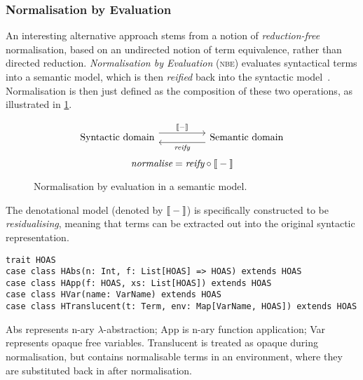 \documentclass[../../main.tex]{subfiles}
\begin{document}

\subsubsection{Normalisation by Evaluation}
An interesting alternative approach stems from a notion of \emph{reduction-free} normalisation, based on an undirected notion of term equivalence, rather than directed reduction.
\emph{Normalisation by Evaluation} (\textsc{nbe}) evaluates syntactical terms into a semantic model, which is then \emph{reified} back into the syntactic model~\cite{filinski_nbe_2004}.
Normalisation is then just defined as the composition of these two operations, as illustrated in \cref{fig:nbe}.

\begin{figure}
\begin{equation*}
\begin{tikzcd}
  \text{Syntactic domain} \arrow[rr, "\text{\textlbrackdbl} - \text{\textrbrackdbl}", shift left=2] &  & \text{Semantic domain} \arrow[ll, "\textit{reify}", shift left=2]
\end{tikzcd}
\end{equation*}
\vspace{0.5ex}
\begin{equation*}
\textit{normalise} = \textit{reify} \circ \text{\textlbrackdbl} - \text{\textrbrackdbl}
\end{equation*}
\caption{Normalisation by evaluation in a semantic model.}
\label{fig:nbe}
\end{figure}

The denotational model (denoted by $\text{\textlbrackdbl} - \text{\textrbrackdbl}$) is specifically constructed to be \emph{residualising}, meaning that terms can be extracted out into the original syntactic representation.


\begin{verbatim}
trait HOAS
case class HAbs(n: Int, f: List[HOAS] => HOAS) extends HOAS
case class HApp(f: HOAS, xs: List[HOAS]) extends HOAS
case class HVar(name: VarName) extends HOAS
case class HTranslucent(t: Term, env: Map[VarName, HOAS]) extends HOAS
\end{verbatim}
%
Abs represents n-ary $\lambda$-abstraction; App is n-ary function application; Var represents opaque free variables.
Translucent is treated as opaque during normalisation, but contains normalisable terms in an environment, where they are substituted back in after normalisation.
\end{document}
